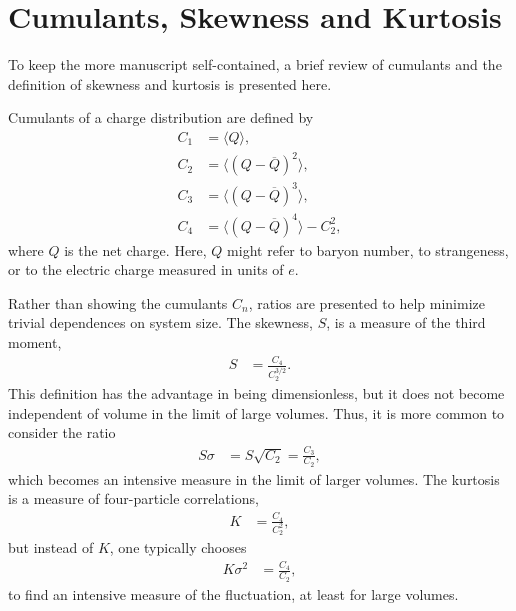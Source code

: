 
\section{Cumulants, Skewness and Kurtosis}

To keep the more manuscript self-contained, a brief review of cumulants and the definition of skewness and kurtosis is presented here.

Cumulants of a charge distribution are defined by 
\begin{eqnarray}
C_1&=\langle Q\rangle,\\
C_2&=\langle(Q-\overline{Q})^2\rangle,\\
C_3&=\langle(Q-\overline{Q})^3\rangle,\\
C_4&=\langle(Q-\overline{Q})^4\rangle-C_2^2,
\end{eqnarray}
where $Q$ is the net charge. Here, $Q$ might refer to baryon number, to strangeness, or to the electric charge measured in units of $e$.

Rather than showing the cumulants $C_n$, ratios are presented to help minimize trivial dependences on system size. The skewness, $S$, is a measure of the third moment,
\begin{eqnarray}
S&=\frac{C_4}{C_2^{3/2}}.
\end{eqnarray}
This definition has the advantage in being dimensionless, but it does not become independent of volume in the limit of large volumes. Thus, it is more common to consider the ratio
\begin{eqnarray}
S\sigma&=S\sqrt{C_2}=\frac{C_3}{C_2},
\end{eqnarray}
which becomes an intensive measure in the limit of larger volumes. The kurtosis is a measure of four-particle correlations,
\begin{eqnarray}
K&=\frac{C_4}{C_2^2},
\end{eqnarray}
but instead of $K$, one typically chooses
\begin{eqnarray}
K\sigma^2&=\frac{C_4}{C_2},
\end{eqnarray}
to find an intensive measure of the fluctuation, at least for large volumes. 

